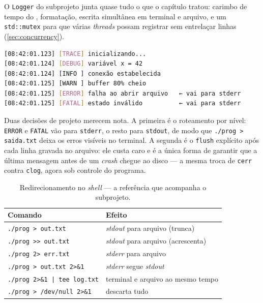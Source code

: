 O \texttt{Logger} do subprojeto junta quase tudo o que o capítulo tratou:
carimbo de tempo do , formatação, escrita simultânea em
terminal e arquivo, e um \texttt{std::mutex} para que várias \emph{threads}
possam registrar sem entrelaçar linhas (\cref{sec:concurrency}).

\begin{lstlisting}[style=bt, language=bash,
    caption={Saída de \texttt{src/file\_io/}: níveis, carimbo e destino.}]
[08:42:01.123] [TRACE] inicializando...
[08:42:01.124] [DEBUG] variável x = 42
[08:42:01.124] [INFO ] conexão estabelecida
[08:42:01.125] [WARN ] buffer 80% cheio
[08:42:01.125] [ERROR] falha ao abrir arquivo   ← vai para stderr
[08:42:01.125] [FATAL] estado inválido          ← vai para stderr
\end{lstlisting}

Duas decisões de projeto merecem nota. A primeira é o roteamento por nível:
\texttt{ERROR} e \texttt{FATAL} vão para \texttt{stderr}, o resto para
\texttt{stdout}, de modo que \texttt{./prog > saida.txt} deixa os erros
visíveis no terminal. A segunda é o \texttt{flush} explícito após cada linha
gravada no arquivo: ele custa caro e é a única forma de garantir que a última
mensagem antes de um \emph{crash} chegue ao disco --- a mesma troca de
\texttt{cerr} contra \texttt{clog}, agora sob controle do programa.

\begin{table}[htbp]
\centering
\caption{Redirecionamento no \emph{shell} --- a referência que acompanha o
         subprojeto.}
\label{tab:redirecionamento}
\footnotesize
\begin{tabular}{@{}ll@{}}
\toprule
\textbf{Comando} & \textbf{Efeito} \\
\midrule
\texttt{./prog > out.txt}            & \emph{stdout} para arquivo (trunca) \\
\texttt{./prog >> out.txt}           & \emph{stdout} para arquivo (acrescenta) \\
\texttt{./prog 2> err.txt}           & \emph{stderr} para arquivo \\
\texttt{./prog > out.txt 2>\&1}      & \emph{stderr} segue \emph{stdout} \\
\texttt{./prog 2>\&1 | tee log.txt}  & terminal e arquivo ao mesmo tempo \\
\texttt{./prog > /dev/null 2>\&1}    & descarta tudo \\
\bottomrule
\end{tabular}
\end{table}

